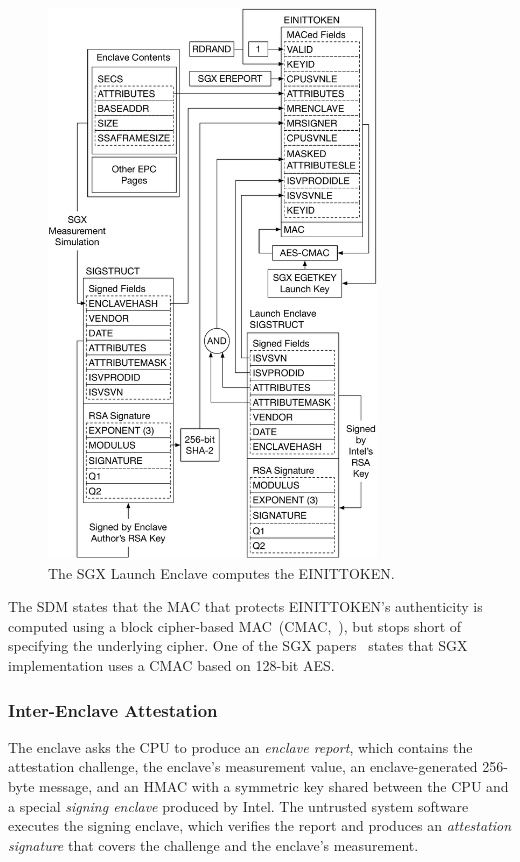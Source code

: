 \begin{figure}[hbt]
  \centering
  \includegraphics[width=87mm]{figures/sgx_einittoken.pdf}
  \caption{
    The SGX Launch Enclave computes the EINITTOKEN.
  }
  \label{fig:sgx_einittoken}
\end{figure}

The SDM states that the MAC that protects EINITTOKEN's authenticity is computed
using a block cipher-based MAC~(CMAC,~\cite{fips2005cmac}), but stops short of
specifying the underlying cipher. One of the SGX papers~\cite{anati2013sgx}
states that SGX implementation uses a CMAC based on 128-bit AES.



\subsubsection{Inter-Enclave Attestation}
\label{sec:sgx_ereport}

The enclave asks the CPU to produce an \textit{enclave report}, which contains
the attestation challenge, the enclave's measurement value, an
enclave-generated 256-byte message, and an HMAC
 with a symmetric key shared between the CPU and a special
\textit{signing enclave} produced by Intel. The untrusted system software
executes the signing enclave, which verifies the report and produces an
\textit{attestation signature} that covers the challenge and the enclave's
measurement.


